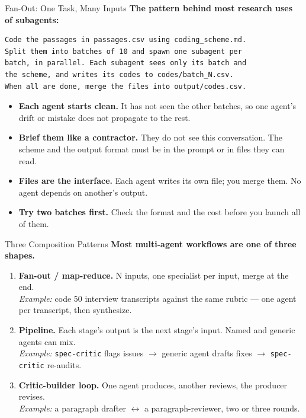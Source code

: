\documentclass[aspectratio=169, 11pt]{beamer}
\begin{document}
\begin{frame}[fragile]{Fan-Out: One Task, Many Inputs}
  \textbf{The pattern behind most research uses of subagents:}

  \vspace{0.4em}
  \begin{lstlisting}[basicstyle=\ttfamily\scriptsize]
Code the passages in passages.csv using coding_scheme.md.
Split them into batches of 10 and spawn one subagent per
batch, in parallel. Each subagent sees only its batch and
the scheme, and writes its codes to codes/batch_N.csv.
When all are done, merge the files into output/codes.csv.
  \end{lstlisting}

  \vspace{0.3em}
  \begin{itemize}\small
    \item \textbf{Each agent starts clean.} It has not seen the other batches, so one agent's drift or mistake does not propagate to the rest.
    \item \textbf{Brief them like a contractor.} They do not see this conversation. The scheme and the output format must be in the prompt or in files they can read.
    \item \textbf{Files are the interface.} Each agent writes its own file; you merge them. No agent depends on another's output.
    \item \textbf{Try two batches first.} Check the format and the cost before you launch all of them.
  \end{itemize}
\end{frame}

\begin{frame}{Three Composition Patterns}
  \textbf{Most multi-agent workflows are one of three shapes.}

  \vspace{0.7em}
  \begin{enumerate}
    \item \textbf{Fan-out / map-reduce.} N inputs, one specialist per input, merge at the end.\\
    \emph{Example:} code 50 interview transcripts against the same rubric --- one agent per transcript, then synthesize.

    \vspace{0.5em}
    \item \textbf{Pipeline.} Each stage's output is the next stage's input. Named and generic agents can mix.\\
    \emph{Example:} \texttt{spec-critic} flags issues $\to$ generic agent drafts fixes $\to$ \texttt{spec-critic} re-audits.

    \vspace{0.5em}
    \item \textbf{Critic-builder loop.} One agent produces, another reviews, the producer revises.\\
    \emph{Example:} a paragraph drafter $\leftrightarrow$ a paragraph-reviewer, two or three rounds.
  \end{enumerate}
\end{frame}
\end{document}
